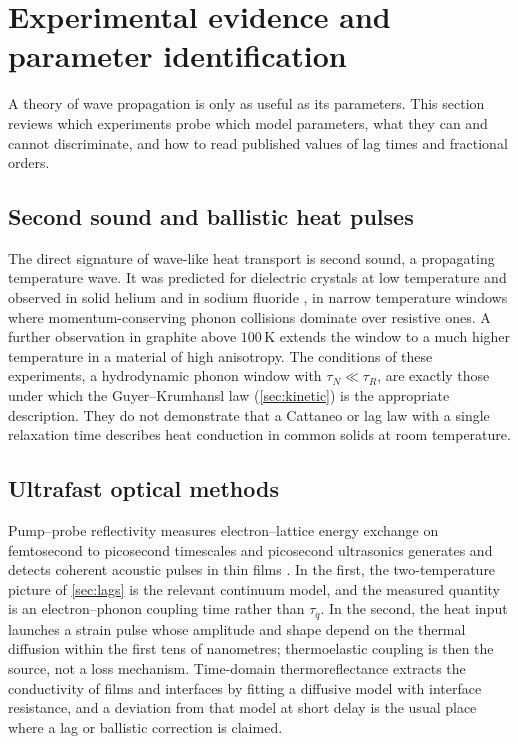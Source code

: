 \section{Experimental evidence and parameter identification}\label{sec:experiments}

A theory of wave propagation is only as useful as its parameters. This section reviews which experiments probe which model parameters, what they can and cannot discriminate, and how to read published values of lag times and fractional orders.

\subsection{Second sound and ballistic heat pulses}
The direct signature of wave-like heat transport is second sound, a propagating temperature wave. It was predicted for dielectric crystals at low temperature \citep{Chester1963,GuyerKrumhansl1966} and observed in solid helium \citep{Ackerman1966} and in sodium fluoride \citep{McNelly1970,Jackson1970}, in narrow temperature windows where momentum-conserving phonon collisions dominate over resistive ones. A further observation in graphite above $100$\,K \citep{Huberman2019} extends the window to a much higher temperature in a material of high anisotropy. The conditions of these experiments, a hydrodynamic phonon window with $\tau_N\ll\tau_R$, are exactly those under which the Guyer--Krumhansl law (\cref{sec:kinetic}) is the appropriate description. They do not demonstrate that a Cattaneo or lag law with a single relaxation time describes heat conduction in common solids at room temperature.

\subsection{Ultrafast optical methods}
Pump--probe reflectivity measures electron--lattice energy exchange on femtosecond to picosecond timescales \citep{Brorson1987} and picosecond ultrasonics generates and detects coherent acoustic pulses in thin films \citep{Thomsen1986}. In the first, the two-temperature picture of \cref{sec:lags} is the relevant continuum model, and the measured quantity is an electron--phonon coupling time rather than $\tau_q$. In the second, the heat input launches a strain pulse whose amplitude and shape depend on the thermal diffusion within the first tens of nanometres; thermoelastic coupling is then the source, not a loss mechanism. Time-domain thermoreflectance \citep{Cahill2003} extracts the conductivity of films and interfaces by fitting a diffusive model with interface resistance, and a deviation from that model at short delay is the usual place where a lag or ballistic correction is claimed.

